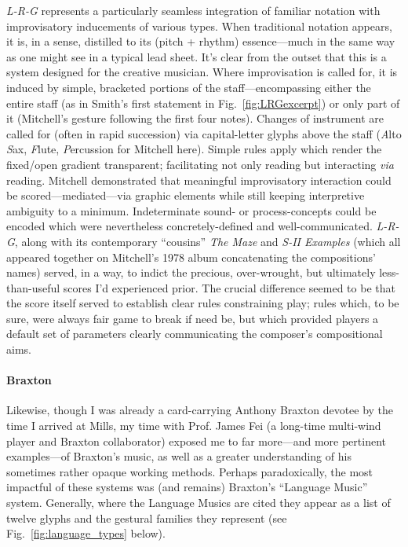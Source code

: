     \textit{L-R-G} represents a particularly seamless integration of familiar notation with improvisatory inducements of various types. When traditional notation appears, it is, in a sense, distilled to its (pitch + rhythm) essence---much in the same way as one might see in a typical lead sheet. It's clear from the outset that this is a system designed for the creative musician. Where improvisation is called for, it is induced by simple, bracketed portions of the staff---encompassing either the entire staff (as in Smith's first statement in Fig.~\ref{fig:LRGexcerpt}) or only part of it (Mitchell's gesture following the first four notes). Changes of instrument are called for (often in rapid succession) via capital-letter glyphs above the staff (\textit{A}lto \textit{S}ax, \textit{F}lute, \textit{P}ercussion for Mitchell here). Simple rules apply which render the fixed/open gradient transparent; facilitating not only reading but interacting \textit{via} reading. Mitchell demonstrated that meaningful improvisatory interaction could be scored---mediated---via graphic elements while still keeping interpretive ambiguity to a minimum. Indeterminate sound- or process-concepts could be encoded which were nevertheless concretely-defined and well-communicated. \textit{L-R-G}, along with its contemporary ``cousins'' \textit{The Maze} and \textit{S-II Examples} (which all appeared together on Mitchell's 1978 album concatenating the compositions' names) served, in a way, to indict the precious, over-wrought, but ultimately less-than-useful scores I'd experienced prior.\autocite{Mitchell_1978} The crucial difference seemed to be that the score itself served to establish clear rules constraining play; rules which, to be sure, were always fair game to break if need be, but which provided players a default set of parameters clearly communicating the composer's compositional aims.

    \paragraph{Braxton}
    Likewise, though I was already a card-carrying Anthony Braxton devotee by the time I arrived at Mills, my time with Prof. James Fei (a long-time multi-wind player and Braxton collaborator) exposed me to far more---and more pertinent examples---of Braxton's music, as well as a greater understanding of his sometimes rather opaque working methods. Perhaps paradoxically, the most impactful of these systems was (and remains) Braxton's ``Language Music'' system. Generally, where the Language Musics are cited they appear as a list of twelve glyphs and the gestural families they represent (see Fig.~\ref{fig:language_types} below). 

